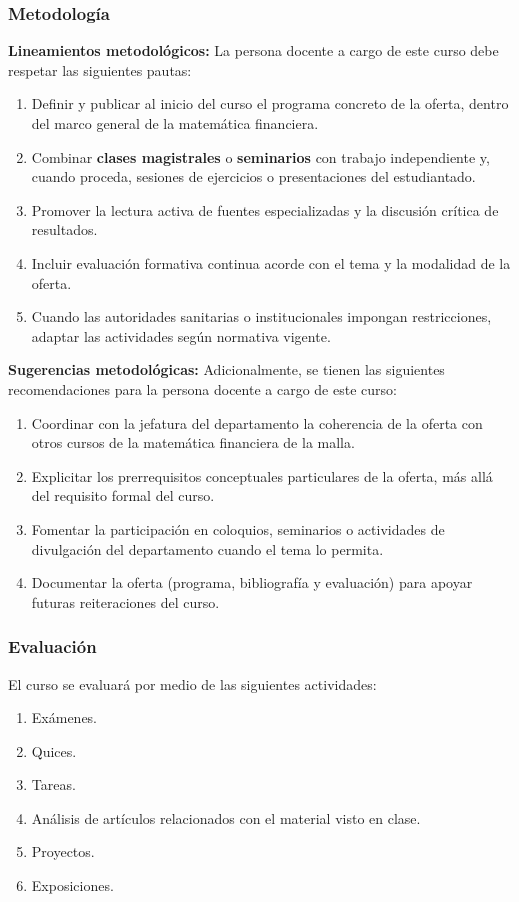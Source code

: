 \begin{refsection}
\subsubsection*{Metodología}

\noindent \textbf{Lineamientos metodológicos:} La persona docente a cargo de este curso debe respetar las siguientes pautas:

\begin{enumerate}
    \item Definir y publicar al inicio del curso el programa concreto de la oferta, dentro del marco general de la matemática financiera.
    \item Combinar \textbf{clases magistrales} o \textbf{seminarios} con trabajo independiente y, cuando proceda, sesiones de ejercicios o presentaciones del estudiantado.
    \item Promover la lectura activa de fuentes especializadas y la discusión crítica de resultados.
    \item Incluir evaluación formativa continua acorde con el tema y la modalidad de la oferta.
    \item Cuando las autoridades sanitarias o institucionales impongan restricciones, adaptar las actividades según normativa vigente.
\end{enumerate}

\textbf{Sugerencias metodológicas:} Adicionalmente, se tienen las siguientes recomendaciones para la persona docente a cargo de este curso:

\begin{enumerate}
    \item Coordinar con la jefatura del departamento la coherencia de la oferta con otros cursos de la matemática financiera de la malla.
    \item Explicitar los prerrequisitos conceptuales particulares de la oferta, más allá del requisito formal del curso.
    \item Fomentar la participación en coloquios, seminarios o actividades de divulgación del departamento cuando el tema lo permita.
    \item Documentar la oferta (programa, bibliografía y evaluación) para apoyar futuras reiteraciones del curso.
\end{enumerate}

\subsubsection*{Evaluación}

El curso se evaluará por medio de las siguientes actividades:

\begin{enumerate}
\item Exámenes.
\item Quices.
\item Tareas.
\item Análisis de artículos relacionados con el material visto en clase.
\item Proyectos.
\item Exposiciones.
\end{enumerate}

\end{refsection}
